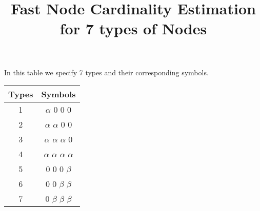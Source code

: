 \documentclass[fleqn]{article}
\begin{document}
\title{Fast Node Cardinality Estimation for 7 types of Nodes}

\maketitle{}

In this table we specify 7 types and their corresponding symbols. 
\begin{center}
  \begin{tabular}{| c | c |}
    \hline
    Types & Symbols \\ \hline
    1 & $\alpha$ $0$ $0$ $0$ \\ \hline
    2 & $\alpha$ $\alpha$ $0$ $0$ \\ \hline
    3 & $\alpha$ $\alpha$ $\alpha$ $0$ \\ \hline
    4 & $\alpha$ $\alpha$ $\alpha$ $\alpha$ \\ \hline
    5 & $0$ $0$ $0$ $\beta$ \\ \hline
    6 & $0$ $0$ $\beta$ $\beta$ \\ \hline
    7 & $0$ $\beta$ $\beta$ $\beta$ \\ \hline
    
    \hline
  \end{tabular}
\end{center}
\end{document}
